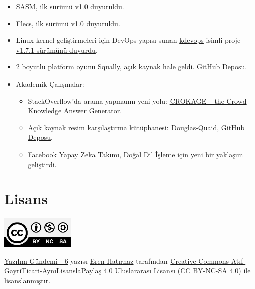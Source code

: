 \documentclass[11pt]{article}
\begin{document}
\begin{itemize}
\item \href{https://github.com/mras0/sasm}{SASM}, ilk sürümü \href{https://github.com/mras0/sasm/releases/tag/v1.0}{v1.0 duyuruldu}.
\item \href{https://github.com/SanderMertens/flecs}{Flecs}, ilk sürümü \href{https://github.com/SanderMertens/flecs/releases/tag/v1.0}{v1.0 duyuruldu}.
\item Linux kernel geliştirmeleri için DevOps yapısı sunan \href{https://github.com/mcgrof/kdevops/}{kdevops} isimli proje
\href{https://github.com/mcgrof/kdevops/releases/tag/v1.7.1}{v1.7.1 sürümünü duyurdu}.
\item 2 boyutlu platform oyunu \href{https://store.steampowered.com/app/770200/Squally/}{Squally}, \href{https://medium.com/squallygame/we-open-sourced-our-steam-game-and-why-it-was-a-good-idea-2d5ac72c9802}{açık kaynak hale geldi}. \href{https://github.com/Squalr/Squally}{GitHub Deposu}.
\item Akademik Çalışmalar:
\begin{itemize}
\item StackOverflow'da arama yapmanın yeni yolu: \href{https://stackoverflow.blog/2019/08/14/crokage-a-new-way-to-search-stack-overflow/}{CROKAGE – the Crowd Knowledge
Answer Generator}.
\item Açık kaynak resim karşılaştırma kütüphanesi: \href{https://arxiv.org/abs/1908.04014}{Douglas-Quaid}, \href{https://github.com/CIRCL/douglas-quaid}{GitHub Deposu}.
\item Facebook Yapay Zeka Takımı, Doğal Dil İşleme için \href{https://ai.facebook.com/blog/new-advances-in-natural-language-processing-to-better-connect-people/}{yeni bir yaklaşım}
geliştirdi.
\end{itemize}
\end{itemize}
\section{Lisans}
\label{sec:org89c1fa2}
\begin{center}
\begin{center}
\includegraphics[height=1.5cm]{../../../img/CC_BY-NC-SA_4.0.png}
\end{center}

\href{yazilim-gundemi-06.pdf}{Yazılım Gündemi - 6} yazısı \href{https://erenhatirnaz.github.io}{Eren Hatırnaz} tarafından \href{http://creativecommons.org/licenses/by-nc-sa/4.0/}{Creative Commons
Atıf-GayriTicari-AynıLisanslaPaylaş 4.0 Uluslararası Lisansı} (CC BY-NC-SA 4.0)
ile lisanslanmıştır.
\end{center}
\end{document}
